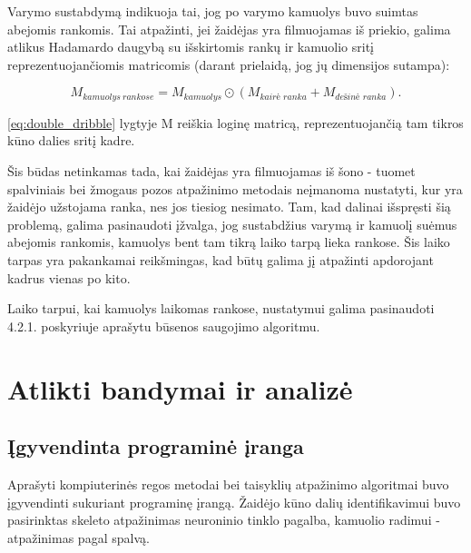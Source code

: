 \documentclass{VUMIFPSbakalaurinis}
\begin{document}
Varymo sustabdymą indikuoja tai, jog po varymo kamuolys buvo suimtas abejomis rankomis. Tai atpažinti, jei žaidėjas yra filmuojamas iš priekio, galima atlikus Hadamardo daugybą su išskirtomis rankų ir kamuolio sritį reprezentuojančiomis matricomis (darant prielaidą, jog jų dimensijos sutampa):

\begin{equation}\label{eq:double_dribble}
	M_{kamuolys\ rankose} = M_{kamuolys} \odot (M_{\textit{kairė\ ranka}} + M_{\textit{dešinė\ ranka}}).
\end{equation}

\ref{eq:double_dribble} lygtyje M reiškia loginę matricą, reprezentuojančią tam tikros kūno dalies sritį kadre. 

Šis būdas netinkamas tada, kai žaidėjas yra filmuojamas iš šono - tuomet spalviniais bei žmogaus pozos atpažinimo metodais neįmanoma nustatyti, kur yra žaidėjo užstojama ranka, nes jos tiesiog nesimato. Tam, kad dalinai išspręsti šią problemą, galima pasinaudoti įžvalga, jog sustabdžius varymą ir kamuolį suėmus abejomis rankomis, kamuolys bent tam tikrą laiko tarpą lieka rankose. Šis laiko tarpas yra pakankamai reikšmingas, kad būtų galima jį atpažinti apdorojant kadrus vienas po kito. 

Laiko tarpui, kai kamuolys laikomas rankose, nustatymui galima pasinaudoti 4.2.1. poskyriuje aprašytu būsenos saugojimo algoritmu. 

\section{Atlikti bandymai ir analizė}

\subsection{Įgyvendinta programinė įranga}

Aprašyti kompiuterinės regos metodai bei taisyklių atpažinimo algoritmai buvo įgyvendinti sukuriant programinę įrangą. Žaidėjo kūno dalių identifikavimui buvo pasirinktas skeleto atpažinimas neuroninio tinklo pagalba, kamuolio radimui - atpažinimas pagal spalvą. 
\end{document}
